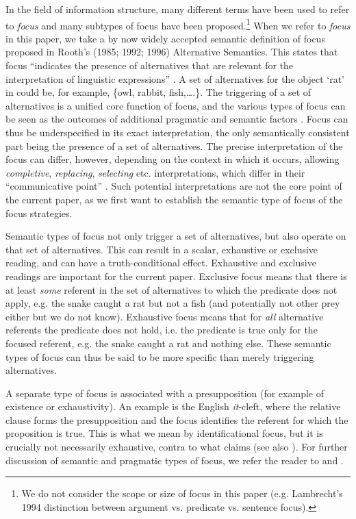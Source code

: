 \documentclass[output=paper]{langsci/langscibook}
\begin{document}
In the field of information structure, many different terms have been used to refer to \textit{focus} and many subtypes of focus have been proposed.\footnote{We do not consider the scope or size of focus in this paper (e.g. Lambrecht's 1994 distinction between argument vs. predicate vs. sentence focus).}{} When we refer to \textit{focus} in this paper, we take a by now widely accepted semantic definition of focus proposed in Rooth’s (1985; 1992; 1996) Alternative Semantics. This states that focus “indicates the presence of alternatives that are relevant for the interpretation of linguistic expressions” \citep[6]{Krifka2007}. A set of alternatives for the object ‘rat’ in  could be, for example, \{owl, rabbit, fish,….\}. The triggering of a set of alternatives is a unified core function of focus, and the various types of focus can be seen as the outcomes of additional pragmatic and semantic factors \citep{ZimmermannOnea2011}. Focus can thus be underspecified in its exact interpretation, the only semantically consistent part being the presence of a set of alternatives. The precise interpretation of the focus can differ, however, depending on the context in which it occurs, allowing \textit{completive}, \textit{replacing}, \textit{selecting} etc. interpretations, which differ in their “communicative point” \citep[281]{Dik1997}. Such potential interpretations are not the core point of the current paper, as we first want to establish the semantic type of focus of the  focus strategies. 

Semantic types of focus not only trigger a set of alternatives, but also operate on that set of alternatives. This can result in a scalar, exhaustive or exclusive reading, and can have a truth-conditional effect. Exhaustive and exclusive readings are important for the current paper. Exclusive focus means that there is at least \textit{some} referent in the set of alternatives to which the predicate does not apply, e.g. the snake caught a rat but not a fish (and potentially not other prey either but we do not know). Exhaustive focus means that for \textit{all} alternative referents the predicate does not hold, i.e. the predicate is true only for the focused referent, e.g. the snake caught a rat and nothing else. These semantic types of focus can thus be said to be more specific than merely triggering alternatives.

A separate type of focus is associated with a presupposition (for example of existence or exhaustivity). An example is the English \textit{it}-cleft, where the relative clause forms the presupposition and the focus identifies the referent for which the proposition is true. This is what we mean by identificational focus, but it is crucially not necessarily exhaustive, contra to what \citet{Kiss1998} claims (see also \citealt{OneaBeaver2011,ByramWashburn2013,DestruelEtAl2015}). For further discussion of semantic and pragmatic types of focus, we refer the reader to \citet{Bazalgette2015} and \citet{Wal2016}.  
\end{document}

